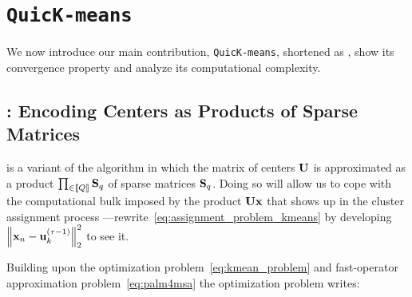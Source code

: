 
\section{\texttt{QuicK-means}}
\label{sec:contribution}

We now introduce our main contribution, \texttt{QuicK-means}, shortened as \qkmeans, 
show its convergence property and analyze its computational complexity.


\subsection{\qkmeans: Encoding Centers as Products of Sparse Matrices}
\label{sec:qkmeans:algo}

\qkmeans is a variant of the \kmeans algorithm in which the matrix of centers ${\mathbf{U}}$
is approximated as a product $\prod_{\in\left \llbracket Q\right \rrbracket}{\mathbf{S}}_q$ of sparse matrices ${\mathbf{S}}_q$.
Doing so will allow us to cope with the computational bulk imposed by the product ${\mathbf{U}}{\mathbf{x}}$
that shows up in the cluster assignment process ---rewrite~\eqref{eq:assignment_problem_kmeans}
 by developing $\left\|{\mathbf{x}}_{n} - {\mathbf{u}}_{k}^{(\tau-1)}\right\|_2^2$ to see it.

Building upon the \kmeans optimization problem~\eqref{eq:kmean_problem} and fast-operator approximation problem~\eqref{eq:palm4msa} the \qkmeans optimization problem 
writes:
%

